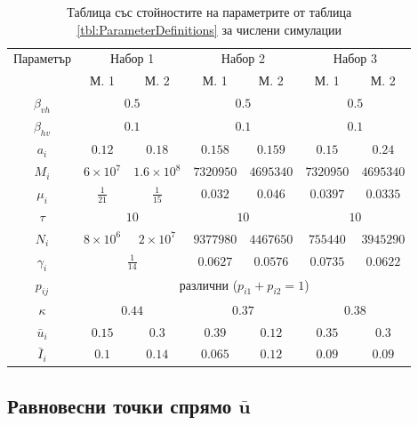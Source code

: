 \begin{table}[H]
  \centering
  \begin{tabular}{ |c ||c c c c c c|  }
    \hline
    \multirow{2}{*}{Параметър}& \multicolumn{2}{c}{Набор 1}& \multicolumn{2}{c}{Набор 2} & \multicolumn{2}{c|}{Набор 3}\\
    & М. 1 & М. 2 & М. 1 & М. 2 & М. 1 & М. 2\\
    \hline
    $\beta_{vh}$ & \multicolumn{2}{c}{$0.5$} & \multicolumn{2}{c}{$0.5$}  & \multicolumn{2}{c|}{$0.5$}\\
    $\beta_{hv}$ & \multicolumn{2}{c}{$0.1$} & \multicolumn{2}{c}{$0.1$} & \multicolumn{2}{c|}{$0.1$}\\
    $a_i$ & $0.12$ & $0.18$ & $0.158$ & $0.159$ & $0.15$ & $0.24$\\
    $M_i$ & $6 \times 10^7$ & $1.6 \times 10^8$ & $7320950$ & $4695340$ & $7320950$ & $4695340$\\
    $\mu_i$ & $\frac{1}{21}$ & $\frac{1}{15}$ & $0.032$ & $0.046$ & $0.0397$ & $0.0335$\\
    $\tau$ & \multicolumn{2}{c}{$10$} & \multicolumn{2}{c}{$10$} & \multicolumn{2}{c|}{$10$}\\
    $N_i$ & $8 \times 10^6$ & $2 \times 10^7$ & $9377980$ & $4467650$ & $755440$ & $3945290$\\
    $\gamma_i$ & \multicolumn{2}{c}{$\frac{1}{14}$} & $0.0627$ & $0.0576$ & $0.0735$ & $0.0622$\\
    $p_{ij}$ & \multicolumn{6}{c|}{различни ($p_{i1}+p_{i2}=1$)}\\
    $\kappa$ & \multicolumn{2}{c}{$0.44$} & \multicolumn{2}{c}{$0.37$} & \multicolumn{2}{c|}{$0.38$}\\
    $\bar{u}_i$ & $0.15$ & $0.3$ & $0.39$ & $0.12$ & $0.35$ & $0.3$\\
    $\bar{I}_i$ & $0.1$ & $0.14$ & $0.065$ & $0.12$ & $0.09$ & $0.09$\\
    \hline
  \end{tabular}
  \caption{Таблица със стойностите на параметрите от таблица \ref{tbl:ParameterDefinitions} за числени симулации}
  \label{tbl:ParameterValues}
\end{table}

\subsection{Равновесни точки спрямо $\bar{\mathbf{u}}$}

